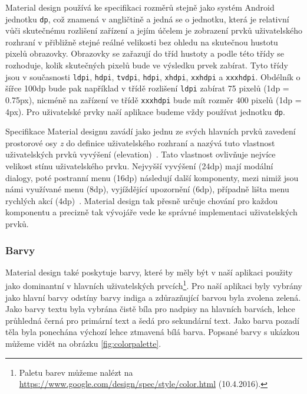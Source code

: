 \documentclass[czech,master,public,dept460,male,java,cpdeclaration]{diploma}
\begin{document}
  Material design používá ke specifikaci rozměrů
  stejně jako systém Android jednotku \texttt{dp}, což znamená v angličtině  a jedná se o jednotku, která je relativní vůči skutečnému rozlišení zařízení a jejím účelem
  je zobrazení prvků uživatelského rozhraní v přibližně stejné reálné velikosti bez ohledu na skutečnou
  hustotu pixelů obrazovky. Obrazovky se zařazují do tříd hustoty a podle této třídy se rozhoduje,
  kolik skutečných pixelů bude ve výsledku prvek zabírat. Tyto třídy jsou v současnosti
  \texttt{ldpi}, \texttt{hdpi}, \texttt{tvdpi}, \texttt{hdpi}, \texttt{xhdpi}, \texttt{xxhdpi} a \texttt{xxxhdpi}.
  Obdélník o šířce 100dp bude pak například v třídě rozlišení \texttt{ldpi} zabírat 75 pixelů (1dp = 0.75px),
  nicméně na zařízení ve třídě \texttt{xxxhdpi} bude mít rozměr 400 pixelů (1dp = 4px). Pro uživatelské
  prvky naší aplikace budeme vždy používat jednotku \texttt{dp}.

  Specifikace Material designu zavádí jako jednu ze svých hlavních prvků zavedení prostorové osy \textit{z} do
  definice uživatelského rozhraní a nazývá tuto vlastnost uživatelských prvků vyvýšení (elevation)~\cite{materialdesign}.
  Tato vlastnost ovlivňuje nejvíce velikost stínu uživatelského prvku. Nejvyšší vyvýšení (24dp)
  mají modální dialogy, poté postranní menu (16dp) následují další komponenty, mezi nimiž jsou námi využívané
  menu (8dp), vyjíždějící upozornění (6dp), případně lišta menu rychlých akcí  (4dp)~\cite{materialdesign}.
  Material design tak přesně určuje chování pro každou komponentu a precizně tak vývojáře vede ke správné
  implementaci uživatelských prvků.


\subsubsection{Barvy}
  Material design také poskytuje barvy, které by měly být v naší aplikaci použity jako dominantní v hlavních
  uživatelských prvcích\footnote{Paletu barev můžeme nalézt na \url{https://www.google.com/design/spec/style/color.html}  (10.4.2016).}.
  Pro naší aplikaci byly vybrány jako hlavní barvy odstíny barvy indiga a zdůrazňující barvou byla zvolena zelená.
  Jako barvy textu byla vybrána čistě bíla pro nadpisy na hlavních barvách, lehce průhledná černá pro
  primární text a šedá pro sekundární text. Jako barva pozadí těla byla ponechána výchozí lehce ztmavená bílá
  barva. Popsané barvy s ukázkou můžeme vidět na obrázku \ref{fig:colorpalette}.
\end{document}
